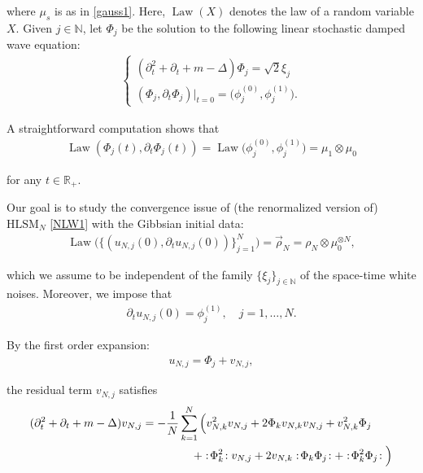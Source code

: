 \documentclass[letterpaper, 11pt,  reqno]{amsart}
\DeclareMathOperator{\Law}{Law}
\newcommand{\1}{\hspace{0.5mm}\text{I}\hspace{0.2mm}}
\newcommand{\noi}{\noindent}
\newcommand{\R}{\mathbb{R}}
\newcommand{\N}{\mathbb{N}}
\newcommand{\Dl}{\Delta}
\newcommand{\dt}{\partial_t}
\newcommand{\rhoo}{\vec \rho_N}
\newcommand{\HLS}{$\text{HLSM}_N$ }
\newcommand{\wick}[1]{:\!{#1}\!:}
\numberwithin{equation}{section}
\numberwithin{theorem}{section}
\begin{document}
\noi
where $\mu_s$ is as in 
\eqref{gauss1}.
Here, $\Law(X)$ denotes the law of a random variable $X$.
Given $j \in \N$, 
let 
 $\Phi_j$ be the solution to the following linear stochastic damped wave equation:
\begin{align}
\begin{cases}
    (\dt^2 + \dt + m - \Dl) \Phi_j = \sqrt{2} \xi_j \\
    (\Phi_j, \dt \Phi_j) |_{t = 0} = \big(\phi^{(0)}_j, \phi^{(1)}_j\big).
\end{cases}
\label{phi1}
\end{align}

\noi
  A straightforward computation shows that 
\begin{align*}
\Law (\Phi_j (t) , \dt \Phi_j(t)) = \Law \big(\phi^{(0)}_j, \phi^{(1)}_j\big) = \mu_1 \otimes \mu_0
\end{align*}

\noi
for any $t \in \R_+$.




Our goal is to study the convergence issue
of (the renormalized version of) \HLS \eqref{NLW1} with the Gibbsian initial data:
\begin{align}
\Law \Big( \{(u_{N, j}(0), \dt u_{N, j}(0))\}_{j = 1}^N \Big) = \rhoo
= \rho_N \otimes \mu_0^{\otimes N}, 
\label{law1}
\end{align}

\noi
which 
we assume to be independent of the family $\{\xi_j\}_{j \in \N}$
of the space-time white noises.
Moreover, we impose that 
\begin{align}
\dt u_{N, j}(0) = \phi_j^{(1)}, \quad j = 1, \dots, N.
\label{law2}
\end{align}

\noi
By  the first order expansion:
\begin{align*}
    u_{N, j} = \Phi_j + v_{N, j},
\end{align*}

\noi
 the residual term $v_{N, j}$ satisfies
\begin{align}
\begin{split}
(\dt^2 + \dt + m - \Dl) v_{N, j} 
& = - \frac{1}{N} \sum_{k = 1}^N \Big( 
v_{N, k}^2 v_{N, j}
+ 2 \Phi_k v_{N, k} v_{N, j}
  + v_{N, k}^2 \Phi_j \\
& 
\hphantom{XXXXX}
 + \wick{\Phi_k^2} v_{N, j} + 2 v_{N, k} \wick{ \Phi_k \Phi_j } 
+ \wick{\Phi_k^2 \Phi_j} \Big)\\
\end{split}
\label{NLW6}
\end{align}
\end{document}
